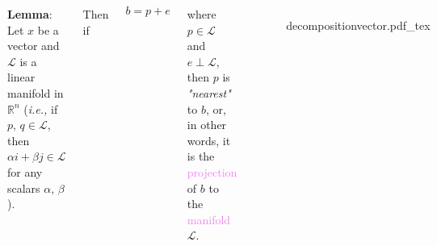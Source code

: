 \documentclass[aspectratio=169]{beamer}
\newcommand{\incfig}[2][1]{%
    \def\svgwidth{#1\columnwidth}
    {#2.pdf_tex} }
\begin{document}

\begin{frame} %

\begin{columns}

		
{\color{violet} \textbf{Lemma}:} Let $x$ be a vector and $\mathcal{L}$ is a linear manifold in $\mathbb{R}^n$
(\textit{i.e., } if $p, \, q \in \mathcal{L}$, then $\alpha i + \beta j \in \mathcal{L}$ for any scalars $\alpha, \, \beta$).

Then if

\[ b = p + e \]

\noindent where $ p \in \mathcal{L}$ and $ e \perp \mathcal{L}$,
then $p$ is \textit{"nearest"} to $b$, or, in other words, it is the \textcolor{violet}{projection}
of $b$ to the \textcolor{violet}{manifold} $\mathcal{L}$.
		

\begin{figure}[ht]
    \centering
    \incfig{decompositionvector}
    \label{fig:decompositionvector}
\end{figure}

\end{columns}
	
\end{frame}
\end{document}
